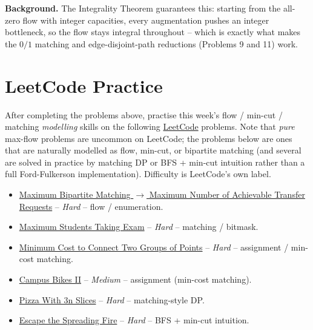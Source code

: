 \documentclass[11pt]{article}
\begin{document}
\textbf{Background.} The Integrality Theorem guarantees this: starting from the all-zero
flow with integer capacities, every augmentation pushes an integer bottleneck, so the flow
stays integral throughout -- which is exactly what makes the $0/1$ matching and
edge-disjoint-path reductions (Problems 9 and 11) work.

\newpage
\section{LeetCode Practice}

After completing the problems above, practise this week's flow / min-cut / matching
\emph{modelling} skills on the following \href{https://leetcode.com}{LeetCode} problems.
Note that \emph{pure} max-flow problems are uncommon on LeetCode; the problems below are
ones that are naturally modelled as flow, min-cut, or bipartite matching (and several are
solved in practice by matching DP or BFS + min-cut intuition rather than a full
Ford-Fulkerson implementation). Difficulty is LeetCode's own label.

\begin{itemize}
  \item \href{https://leetcode.com/problems/maximum-number-of-achievable-transfer-requests/}{Maximum Bipartite Matching $\to$ Maximum Number of Achievable Transfer Requests} -- \emph{Hard} -- flow / enumeration.
  \item \href{https://leetcode.com/problems/maximum-students-taking-exam/}{Maximum Students Taking Exam} -- \emph{Hard} -- matching / bitmask.
  \item \href{https://leetcode.com/problems/minimum-cost-to-connect-two-groups-of-points/}{Minimum Cost to Connect Two Groups of Points} -- \emph{Hard} -- assignment / min-cost matching.
  \item \href{https://leetcode.com/problems/campus-bikes-ii/}{Campus Bikes II} -- \emph{Medium} -- assignment (min-cost matching).
  \item \href{https://leetcode.com/problems/pizza-with-3n-slices/}{Pizza With 3n Slices} -- \emph{Hard} -- matching-style DP.
  \item \href{https://leetcode.com/problems/escape-the-spreading-fire/}{Escape the Spreading Fire} -- \emph{Hard} -- BFS + min-cut intuition.
\end{itemize}
\end{document}

